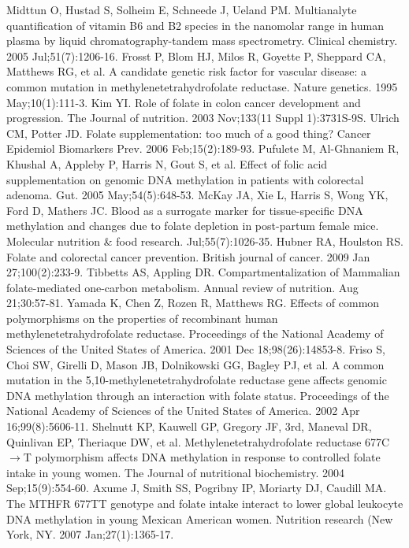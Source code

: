 \begin{thebibliography}{12}
		Midttun O, Hustad S, Solheim E, Schneede J, Ueland PM. Multianalyte quantification of vitamin B6 and B2 species in the nanomolar range in human plasma by liquid chromatography-tandem mass spectrometry. Clinical chemistry. 2005 Jul;51(7):1206-16. 
		Frosst P, Blom HJ, Milos R, Goyette P, Sheppard CA, Matthews RG, et al. A candidate genetic risk factor for vascular disease: a common mutation in methylenetetrahydrofolate reductase. Nature genetics. 1995 May;10(1):111-3. 
		Kim YI. Role of folate in colon cancer development and progression. The Journal of nutrition. 2003 Nov;133(11 Suppl 1):3731S-9S. 
		Ulrich CM, Potter JD. Folate supplementation: too much of a good thing? Cancer Epidemiol Biomarkers Prev. 2006 Feb;15(2):189-93. 
		Pufulete M, Al-Ghnaniem R, Khushal A, Appleby P, Harris N, Gout S, et al. Effect of folic acid supplementation on genomic DNA methylation in patients with colorectal adenoma. Gut. 2005 May;54(5):648-53. 
		McKay JA, Xie L, Harris S, Wong YK, Ford D, Mathers JC. Blood as a surrogate marker for tissue-specific DNA methylation and changes due to folate depletion in post-partum female mice. Molecular nutrition \& food research.  Jul;55(7):1026-35. 
		Hubner RA, Houlston RS. Folate and colorectal cancer prevention. British journal of cancer. 2009 Jan 27;100(2):233-9. 
		Tibbetts AS, Appling DR. Compartmentalization of Mammalian folate-mediated one-carbon metabolism. Annual review of nutrition.  Aug 21;30:57-81. 
		Yamada K, Chen Z, Rozen R, Matthews RG. Effects of common polymorphisms on the properties of recombinant human methylenetetrahydrofolate reductase. Proceedings of the National Academy of Sciences of the United States of America. 2001 Dec 18;98(26):14853-8. 
		Friso S, Choi SW, Girelli D, Mason JB, Dolnikowski GG, Bagley PJ, et al. A common mutation in the 5,10-methylenetetrahydrofolate reductase gene affects genomic DNA methylation through an interaction with folate status. Proceedings of the National Academy of Sciences of the United States of America. 2002 Apr 16;99(8):5606-11. 
		Shelnutt KP, Kauwell GP, Gregory JF, 3rd, Maneval DR, Quinlivan EP, Theriaque DW, et al. Methylenetetrahydrofolate reductase 677C$\rightarrow$T polymorphism affects DNA methylation in response to controlled folate intake in young women. The Journal of nutritional biochemistry. 2004 Sep;15(9):554-60. 
		Axume J, Smith SS, Pogribny IP, Moriarty DJ, Caudill MA. The MTHFR 677TT genotype and folate intake interact to lower global leukocyte DNA methylation in young Mexican American women. Nutrition research (New York, NY. 2007 Jan;27(1):1365-17. 

\end{thebibliography}
